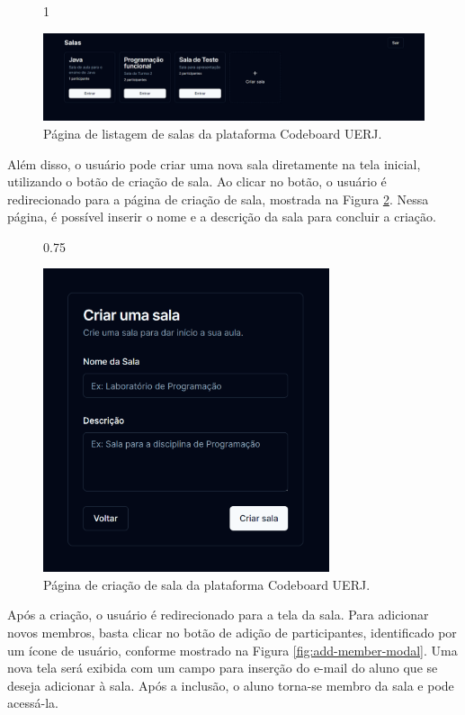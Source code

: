 \begin{figure}[H]{1\textwidth}
    \centering
    \caption{Página de listagem de salas da plataforma Codeboard UERJ.}
    \label{fig:rooms-page}
    \includegraphics[width=1\textwidth]{assets/codeboard/rooms-page.png}
\end{figure}


Além disso, o usuário pode criar uma nova sala diretamente na tela inicial, utilizando o botão de criação de sala. Ao clicar no botão, o usuário é redirecionado para a página de criação de sala, mostrada na Figura \ref{fig:create-room-page}. Nessa página, é possível inserir o nome e a descrição da sala para concluir a criação.

\begin{figure}[H]{0.75\textwidth}
    \centering
    \caption{Página de criação de sala da plataforma Codeboard UERJ.}
    \label{fig:create-room-page}
    \includegraphics[width=0.75\textwidth]{assets/codeboard/create-room-page.png}
\end{figure}

Após a criação, o usuário é redirecionado para a tela da sala. Para adicionar novos membros, basta clicar no botão de adição de participantes, identificado por um ícone de usuário, conforme mostrado na Figura \ref{fig:add-member-modal}. Uma nova tela será exibida com um campo para inserção do e-mail do aluno que se deseja adicionar à sala. Após a inclusão, o aluno torna-se membro da sala e pode acessá-la.

